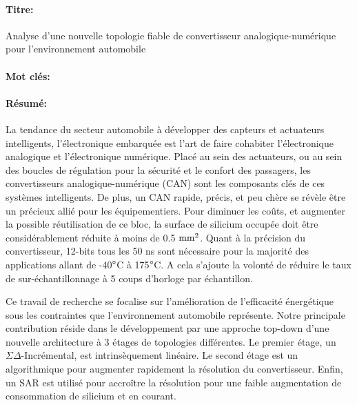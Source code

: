 \clearpage
\begin{mdframed}[linecolor=Prune,linewidth=1]
\vspace{-.25cm}
\paragraph*{Titre:} Analyse d’une nouvelle topologie fiable de convertisseur analogique-numérique pour \newline l'environnement automobile

\begin{small}
\vspace{-.25cm}
\paragraph*{Mot clés:} 

\vspace{-.5cm}
\begin{multicols}{2}
\paragraph*{Résumé:} 
La tendance du secteur automobile à développer des capteurs et actuateurs intelligents, l'électronique embarquée est l'art de faire cohabiter l'électronique analogique et l'électronique numérique. Placé au sein des actuateurs, ou au sein des boucles de régulation pour la sécurité et le confort des passagers, les convertisseurs analogique-numérique (CAN) sont les composants clés de ces systèmes intelligents. De plus, un CAN rapide, précis, et peu chère se révèle être un précieux allié pour les équipementiers. Pour diminuer les coûts, et augmenter la possible réutilisation de ce bloc, la surface de silicium occupée doit être considérablement réduite à moins de 0.5 $\rm mm^2$. Quant à la précision du convertisseur, 12-bits tous les 50 ns sont nécessaire pour la majorité des applications allant de -40\(\degree \)C à 175\(\degree \)C. A cela s'ajoute la volonté de réduire le taux de sur-échantillonnage à 5 coups d'horloge par échantillon.

Ce travail de recherche se focalise sur l'amélioration de l'efficacité énergétique sous les contraintes que l'environnement automobile représente. Notre principale contribution réside dans le développement par une approche top-down d'une nouvelle architecture à 3 étages de topologies différentes. Le premier étage, un $\Sigma\Delta$-Incrémental, est intrinsèquement linéaire. Le second étage est un algorithmique pour augmenter rapidement la résolution du convertisseur. Enfin, un SAR est utilisé pour accroître la résolution pour une faible augmentation de consommation de silicium et en courant.


\end{multicols}
\end{small}
\end{mdframed}
